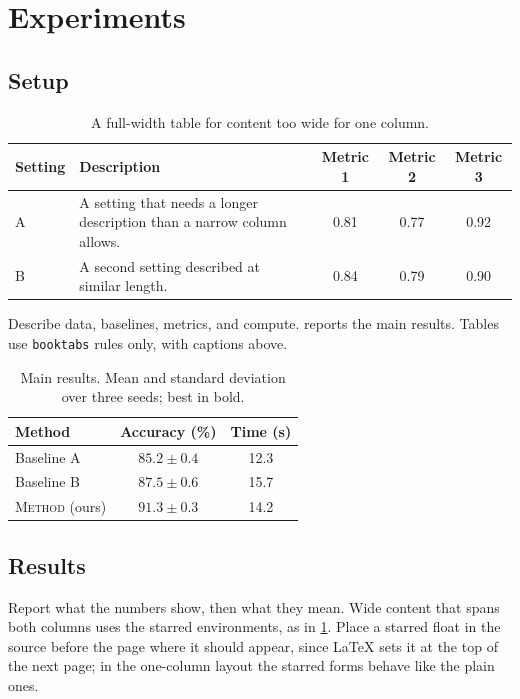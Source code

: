 \documentclass[twocolumn]{ulpaper}
\newcommand{\method}{\textsc{Method}}
\begin{document}
\section{Experiments}
\label{sec:experiments}

\subsection{Setup}

\begin{table}[t]
\caption{A full-width table for content too wide for one column.}
\label{tab:wide}
\centering
\small
\begin{tabularx}{\textwidth}{@{}l X c c c@{}}
\toprule
Setting & Description & Metric 1 & Metric 2 & Metric 3 \\
\midrule
A & A setting that needs a longer description than a narrow column allows. & 0.81 & 0.77 & 0.92 \\
B & A second setting described at similar length. & 0.84 & 0.79 & 0.90 \\
\bottomrule
\end{tabularx}
\end{table}

Describe data, baselines, metrics, and compute.  reports the main results. Tables use \texttt{booktabs} rules only, with captions above.

\begin{table}[t]
\caption{Main results. Mean and standard deviation over three seeds; best in bold.}
\label{tab:main}
\centering
\small
\begin{tabular}{@{}lcc@{}}
\toprule
Method & Accuracy (\%) & Time (s) \\
\midrule
Baseline A & $85.2 \pm 0.4$ & 12.3 \\
Baseline B & $87.5 \pm 0.6$ & 15.7 \\
\method{} (ours) & $\mathbf{91.3} \pm 0.3$ & 14.2 \\
\bottomrule
\end{tabular}
\end{table}

\subsection{Results}

Report what the numbers show, then what they mean. Wide content that spans both columns uses the starred environments, as in \cref{tab:wide}. Place a starred float in the source before the page where it should appear, since LaTeX sets it at the top of the next page; in the one-column layout the starred forms behave like the plain ones.
\end{document}
